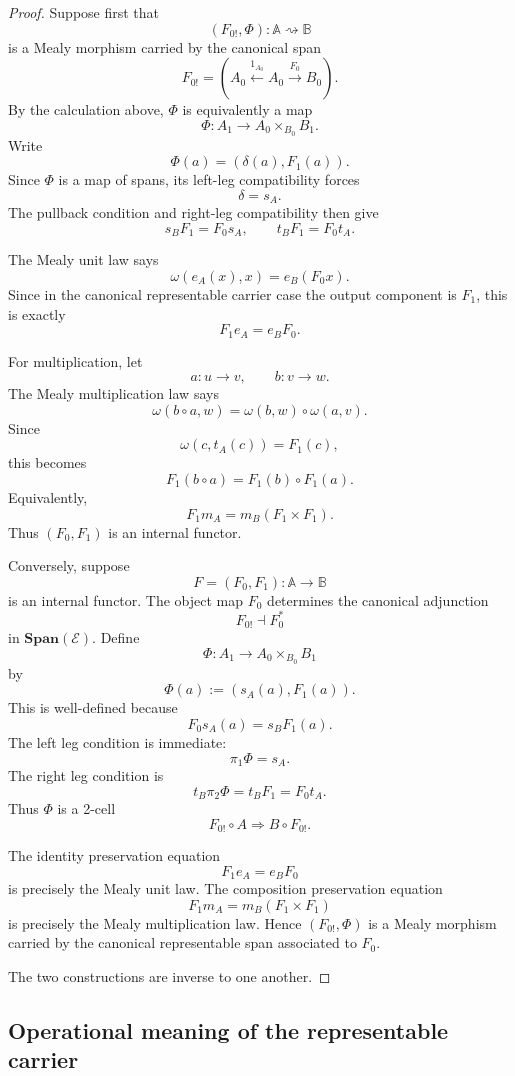 \begin{proof}
Suppose first that
\[
(F_{0!},\Phi):\mathbb A\rightsquigarrow\mathbb B
\]
is a Mealy morphism carried by the canonical span
\[
F_{0!}
=
\left(
A_0
\xleftarrow{1_{A_0}}
A_0
\xrightarrow{F_0}
B_0
\right).
\]
By the calculation above, \(\Phi\) is equivalently a map
\[
\Phi:A_1\to A_0\times_{B_0}B_1.
\]
Write
\[
\Phi(a)=(\delta(a),F_1(a)).
\]
Since \(\Phi\) is a map of spans, its left-leg compatibility forces
\[
\delta=s_A.
\]
The pullback condition and right-leg compatibility then give
\[
s_BF_1=F_0s_A,
\qquad
t_BF_1=F_0t_A.
\]

The Mealy unit law says
\[
\omega(e_A(x),x)=e_B(F_0x).
\]
Since in the canonical representable carrier case the output component is \(F_1\), this is exactly
\[
F_1e_A=e_BF_0.
\]

For multiplication, let
\[
a:u\to v,
\qquad
b:v\to w.
\]
The Mealy multiplication law says
\[
\omega(b\circ a,w)
=
\omega(b,w)\circ \omega(a,v).
\]
Since
\[
\omega(c,t_A(c))=F_1(c),
\]
this becomes
\[
F_1(b\circ a)=F_1(b)\circ F_1(a).
\]
Equivalently,
\[
F_1m_A=m_B(F_1\times F_1).
\]
Thus \((F_0,F_1)\) is an internal functor.

Conversely, suppose
\[
F=(F_0,F_1):\mathbb A\to\mathbb B
\]
is an internal functor. The object map \(F_0\) determines the canonical adjunction
\[
F_{0!}\dashv F_0^\ast
\]
in \(\mathbf{Span}(\mathcal E)\). Define
\[
\Phi:A_1\to A_0\times_{B_0}B_1
\]
by
\[
\Phi(a):=(s_A(a),F_1(a)).
\]
This is well-defined because
\[
F_0s_A(a)=s_BF_1(a).
\]
The left leg condition is immediate:
\[
\pi_1\Phi=s_A.
\]
The right leg condition is
\[
t_B\pi_2\Phi=t_BF_1=F_0t_A.
\]
Thus \(\Phi\) is a 2-cell
\[
F_{0!}\circ A\Rightarrow B\circ F_{0!}.
\]

The identity preservation equation
\[
F_1e_A=e_BF_0
\]
is precisely the Mealy unit law. The composition preservation equation
\[
F_1m_A=m_B(F_1\times F_1)
\]
is precisely the Mealy multiplication law. Hence \((F_{0!},\Phi)\) is a Mealy morphism carried by the canonical representable span associated to \(F_0\).

The two constructions are inverse to one another.
\end{proof}

\subsection{Operational meaning of the representable carrier}
\label{subsec:operational-meaning-left-adjoint-carrier}

